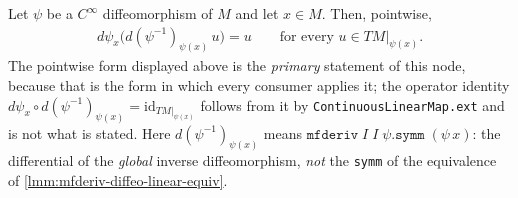 \begin{lemma}
    \label{lmm:mfderiv-symm-cancel-left}
    Let $\psi$ be a $C^\infty$ diffeomorphism of $M$ and let $x \in M$. Then, pointwise,
    \begin{align}
        d\psi_x\big(d(\psi^{-1})_{\psi(x)}\,u\big) = u \qquad \text{for every } u \in TM|_{\psi(x)}.
    \end{align}
    The pointwise form displayed above is the \emph{primary} statement of this node, because that is the form in which every consumer applies it; the operator identity $d\psi_x \circ d(\psi^{-1})_{\psi(x)} = \mathrm{id}_{TM|_{\psi(x)}}$ follows from it by \texttt{ContinuousLinearMap.ext} and is not what is stated. Here $d(\psi^{-1})_{\psi(x)}$ means $\mathtt{mfderiv}\;I\;I\;\psi.\mathtt{symm}\;(\psi\,x)$: the differential of the \emph{global} inverse diffeomorphism, \emph{not} the \texttt{symm} of the equivalence of \ref{lmm:mfderiv-diffeo-linear-equiv}.
\end{lemma}
